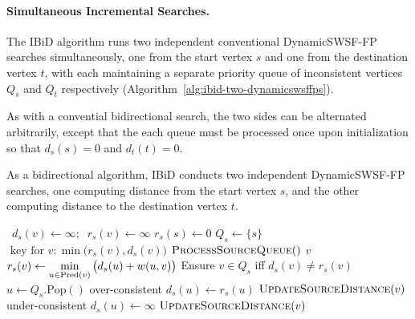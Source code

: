 \paragraph{Simultaneous Incremental Searches.}
The IBiD algorithm runs two independent conventional
DynamicSWSF-FP \citep{ramalingam1996dynamicswsffp}
searches simultaneously,
one from the start vertex $s$
and one from the destination vertex $t$,
with each maintaining a separate priority queue of
inconsistent vertices $Q_s$ and $Q_t$ respectively
(Algorithm~\ref{alg:ibid-two-dynamicswsffps}).

As with a convential bidirectional search,
the two sides can be alternated arbitrarily,
except that the each queue must be processed once upon initialization
so that $d_s(s) = 0$ and $d_t(t) = 0$.

{
\begin{algorithm}[t]
   \caption{As a bidirectional algorithm,
      IBiD conducts two independent DynamicSWSF-FP searches,
      one computing distance from the start vertex $s$,
      and the other computing distance to the destination vertex $t$.}
   \label{alg:ibid-two-dynamicswsffps}
   \begin{minipage}[t]{8.2cm}
      \begin{algorithmic}[1]
          {\,\!}
               \State $d_s(v) \gets \infty; \;\; r_s(v) \gets \infty$
            \EndFor
            \State $r_s(s) \gets 0$
            \State $Q_s \gets \{ s \}$
               \Comment $\mbox{ key for } v: \min\big(r_s(v),d_s(v)\big)$
            \State $\mbox{\sc ProcessSourceQueue}()$
         \EndProcedure
          {$v$}
               \State $r_s(v) \gets \displaystyle\min_{u \in \mbox{\scriptsize Pred}(v)}
                  \big( d_s(u) + w(u,v) \big)$
            \EndIf
            \State Ensure $v \in Q_s$ iff $d_s(v) \neq r_s(v)$
         \EndProcedure
          {\,\!}
            \State $u \gets Q_s.\mbox{Pop}()$
                  \Comment over-consistent
               \State $d_s(u) \gets r_s(u)$
                  \State $\mbox{\sc UpdateSourceDistance}(v)$
               \EndFor
            \Else
                  \Comment under-consistent
               \State $d_s(u) \gets \infty$
                  \State $\mbox{\sc UpdateSourceDistance}(v)$

\end{algorithmic}
\end{minipage}
\end{algorithm}}
